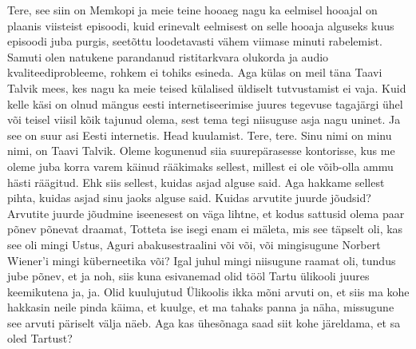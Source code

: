 


Tere, see siin on Memkopi ja meie teine hooaeg nagu ka eelmisel hooajal on plaanis viisteist episoodi, kuid erinevalt eelmisest on selle hooaja alguseks kuus episoodi juba purgis, seetõttu loodetavasti vähem viimase minuti rabelemist. Samuti olen natukene parandanud ristitarkvara olukorda ja audio kvaliteediprobleeme, rohkem ei tohiks esineda. Aga külas on meil täna Taavi Talvik mees, kes nagu ka meie teised külalised üldiselt tutvustamist ei vaja. Kuid kelle käsi on olnud mängus eesti internetiseerimise juures tegevuse tagajärgi ühel või teisel viisil kõik tajunud olema, sest tema tegi niisuguse asja nagu uninet. Ja see on suur asi Eesti internetis. Head kuulamist.
Tere, tere. Sinu nimi on minu nimi, on Taavi Talvik.
Oleme kogunenud siia suurepärasesse kontorisse, kus me oleme juba korra varem käinud rääkimaks sellest, millest ei ole võib-olla ammu hästi räägitud. Ehk siis sellest, kuidas asjad alguse said. Aga hakkame sellest pihta, kuidas asjad sinu jaoks alguse said. Kuidas arvutite juurde jõudsid?
Arvutite juurde jõudmine iseenesest on väga lihtne, et kodus sattusid olema paar põnev põnevat draamat, Totteta ise isegi enam ei mäleta, mis see täpselt oli, kas see oli mingi Ustus, Aguri abakusestraalini või või, või mingisugune Norbert Wiener'i mingi küberneetika või? Igal juhul mingi niisugune raamat oli, tundus jube põnev, et ja noh, siis kuna esivanemad olid tööl Tartu ülikooli juures keemikutena ja, ja.
Olid kuulujutud Ülikoolis ikka mõni arvuti on, et siis ma kohe hakkasin neile pinda käima, et kuulge, et ma tahaks panna ja näha, missugune see arvuti päriselt välja näeb.
Aga kas ühesõnaga saad siit kohe järeldama, et sa oled Tartust?
